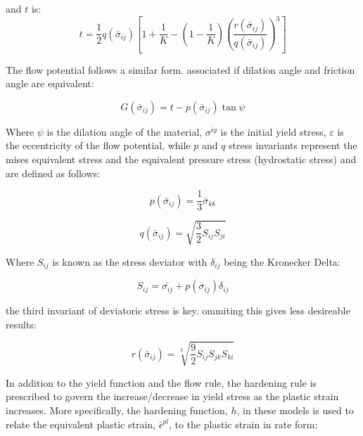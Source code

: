 and $t$ is:
\begin{equation}
t=\frac{1}{2}q\left(\bar{\sigma}_{ij}\right)\left [ 1+\frac{1}{K}-\left ( 1-\frac{1}{K} \right )\left ( \frac{r\left(\bar{\sigma}_{ij}\right)}{q\left(\bar{\sigma}_{ij}\right)} \right )^3 \right ]
\label{eqn:const10}
\end{equation}

The flow potential follows a similar form. associated if dilation angle and friction angle are equivalent:

\begin{equation}
G\left(\bar{\sigma}_{ij}\right)=t-p\left(\bar{\sigma}_{ij}\right)\tan\psi\label{eqn:const11}
\end{equation}

Where $\psi$ is the dilation angle of the material, $\sigma^{iy}$ is the initial yield stress, $\varepsilon$ is the eccentricity of the flow potential, while $p$ and $q$ stress invariants represent the mises equivalent stress and the equivalent pressure stress (hydrostatic stress) and are defined as follows:

\begin{equation}
p\left(\bar{\sigma}_{ij}\right)=\frac{1}{3}\bar{\sigma}_{kk}
\label{eqn:druc3}
\end{equation}

\begin{equation}
q\left(\bar{\sigma}_{ij}\right)=\sqrt{\frac{3}{2}S_{ij}S_{ji}}\label{eqn:druc4}
\end{equation}

Where $S_{ij}$ is known as the stress deviator with $\delta_{ij}$ being the Kronecker Delta:

\begin{equation}
S_{ij} = \bar{\sigma_{ij}} + p\left(\bar{\sigma}_{ij}\right)\delta_{ij}
\label{eqn:druc4-1}
\end{equation}

the third invariant of deviatoric stress is key. ommiting this gives less desireable results:

\begin{equation}
r\left(\bar{\sigma}_{ij}\right)= \sqrt[3]{\frac{9}{2}S_{ij} S_{jk} S_{ki}}
\label{eqn:druc4-2}
\end{equation}

In addition to the yield function and the flow rule, the hardening rule is prescribed to govern the increase/decrease in yield stress as the plastic strain increases. More specifically, the hardening function, $h$, in these models is used to relate the equivalent plastic strain, $\bar{\epsilon}^{pl}$,  to the plastic strain in rate form: 

